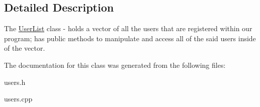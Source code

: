 \subsection{Detailed Description}
The \hyperlink{class_user_list}{User\+List} class -\/ holds a vector of all the users that are registered within our program; has public methods to manipulate and access all of the said users inside of the vector. 

The documentation for this class was generated from the following files\+:\begin{DoxyCompactItemize}
\item 
users.\+h\item 
users.\+cpp\end{DoxyCompactItemize}
